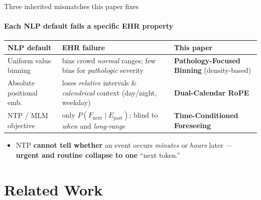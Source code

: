 \documentclass[10pt, aspectratio=169, t]{beamer}   %
\newcommand{\warn}[1]{{\color{negmag}\bfseries #1}}   %
\begin{document}
\begin{frame}{Three inherited mismatches this paper fixes}
  \framesubtitle{Each NLP default fails a specific EHR property}
  \vfill
  \begin{center}
  \renewcommand{\arraystretch}{1.35}
  \setlength{\tabcolsep}{6pt}
  \begin{tabular}{@{}>{\raggedright\arraybackslash}p{} >{\raggedright\arraybackslash}p{} >{\raggedright\arraybackslash}p{}@{}}
    \toprule
    \textbf{NLP default} & \textbf{EHR failure} & \textbf{This paper}\\
    \midrule
    Uniform value binning & bins crowd \emph{normal} ranges; few bins for \emph{pathologic} severity & \textbf{Pathology-Focused Binning} (density-based)\\
    \rowcolor{accent!8}
    Absolute positional emb.\ & loses \emph{relative} intervals \& \emph{calendrical} context (day/night, weekday) & \textbf{Dual-Calendar RoPE}\\
    NTP / MLM objective & only $P(F_{\text{next}}\!\mid\! E_{\text{past}})$; blind to \emph{when} and \emph{long-range} & \textbf{Time-Conditioned Foreseeing}\\
    \bottomrule
  \end{tabular}
  \end{center}
  \vfill
  \begin{itemize}\setlength{\itemsep}{4pt}
    \item NTP \warn{cannot tell whether} an event occurs \emph{minutes} or \emph{hours} later --- \warn{urgent and routine collapse to one} ``next token.''
  \end{itemize}
  \vfill
\end{frame}

\section{Related Work}
\end{document}
